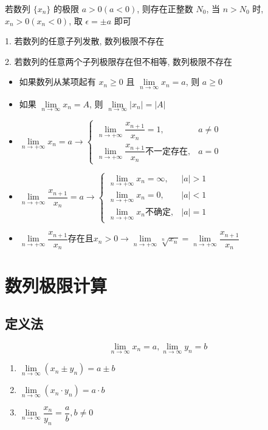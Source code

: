 \begin{corollary}[保号性]
	若数列 $\{x_{n}\}$ 的极限 $a>0(a<0)$, 则存在正整数 $N_{0}$, 当 $n>N_{0}$ 时, $x_{n}>0(x_{n}<0)$, 取 $\epsilon = \pm a$ 即可
\end{corollary}
\begin{anymark}[注]
	1. 若数列的任意子列发散, 数列极限不存在

	2. 若数列的任意两个子列极限存在但不相等, 数列极限不存在
\end{anymark}
\begin{corollary}[数列极限]
	\begin{itemize}
		\item 如果数列从某项起有 $x_{n}\geq 0$ 且 $\lim\limits_{n\to\infty}x_{n} = a$, 则 $a\geq 0$
		\item 如果 $\lim\limits_{n\to\infty} x_{n} = A$, 则 $\lim\limits_{n\to\infty} |x_{n}| = |A|$
		\item $\lim\limits_{n\rightarrow +\infty}x_{n}=a\to \begin{cases} \lim\limits_{n\rightarrow +\infty}\dfrac{x_{n+1}}{x_{n}}=1, & a\neq 0\\ \lim\limits_{n\rightarrow +\infty}\dfrac{x_{n+1}}{x_{n}} \text{不一定存在}, & a=0  \end{cases}$
		\item $\lim\limits_{n\rightarrow +\infty}\dfrac{x_{n+1}}{x_{n}}=a\to \begin{cases} \lim\limits_{n\rightarrow +\infty}x_{n}=\infty,& |a|>1  \\ \lim\limits_{n\rightarrow +\infty}x_{n}=0,&|a|<1\\  \lim\limits_{n\rightarrow +\infty}x_{n}\text{不确定},&|a|=1 \end{cases}$
		\item $\lim\limits_{n\rightarrow +\infty}\dfrac{x_{n+1}}{x_{n}}\text{存在且}x_{n}>0\to \lim\limits_{n\rightarrow +\infty}\sqrt[n]{x_{n}}=\lim\limits_{n\rightarrow +\infty}\dfrac{x_{n+1}}{x_{n}}$
	\end{itemize}
\end{corollary}

\section{数列极限计算}
\subsection{定义法}
\begin{definition}[极限的四则运算]
	$$\lim\limits_{n\to \infty}x_{n}=a,\lim\limits_{n\to \infty}y_{n}=b$$
	\begin{enumerate}
		\item $\lim\limits_{n\to \infty}(x_{n}\pm y_{n}) = a\pm b$
		\item $\lim\limits_{n\to \infty}(x_{n}\cdot y_{n}) = a\cdot b$
		\item $\lim\limits_{n\to \infty}\dfrac{x_{n}}{y_{n}} = \dfrac{a}{b}, b\neq 0$
	\end{enumerate}

\end{definition}
